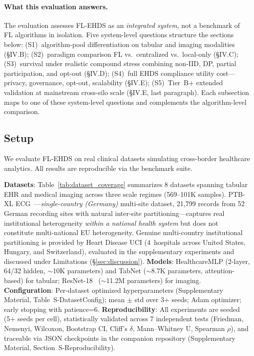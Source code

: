 \documentclass[conference]{IEEEtran}
\begin{document}
\paragraph{What this evaluation answers.} The evaluation assesses FL-EHDS as an \emph{integrated system}, not a benchmark of FL algorithms in isolation. Five system-level questions structure the sections below: (S1)~algorithm-pool differentiation on tabular and imaging modalities (\S IV.B); (S2)~paradigm comparison FL vs.\ centralized vs.\ local-only (\S IV.C); (S3)~survival under realistic compound stress combining non-IID, DP, partial participation, and opt-out (\S IV.D); (S4)~full EHDS compliance utility cost---privacy, governance, opt-out, scalability (\S IV.E); (S5)~Tier~B+ extended validation at mainstream cross-silo scale (\S IV.E, last paragraph). Each subsection maps to one of these system-level questions and complements the algorithm-level comparison.

\subsection{Setup}

We evaluate FL-EHDS on real clinical datasets simulating cross-border healthcare analytics. All results are reproducible via the benchmark suite.

\textbf{Datasets}: Table~\ref{tab:dataset_coverage} summarizes 8 datasets spanning tabular EHR and medical imaging across three scale regimes (569--101K samples). PTB-XL ECG~\cite{wagner2020ptbxl}---\emph{single-country (Germany)} multi-site dataset, 21,799 records from 52 German recording sites with natural inter-site partitioning---captures real institutional heterogeneity \emph{within a national health system} but does not constitute multi-national EU heterogeneity. Genuine multi-country institutional partitioning is provided by Heart Disease UCI (4~hospitals across United States, Hungary, and Switzerland), evaluated in the supplementary experiments and discussed under Limitations (\S\ref{sec:discussion}). \textbf{Models}: HealthcareMLP (2-layer, 64/32 hidden, $\sim$10K parameters) and TabNet ($\sim$8.7K parameters, attention-based) for tabular; ResNet-18~\cite{he2016deep} ($\sim$11.2M parameters) for imaging. \textbf{Configuration}: Per-dataset optimized hyperparameters (Supplementary Material, Table~S-DatasetConfig); mean $\pm$ std over 3+ seeds; Adam optimizer; early stopping with patience=6. \textbf{Reproducibility}: All experiments are seeded (5+ seeds per cell), statistically validated across 7 independent tests (Friedman, Nemenyi, Wilcoxon, Bootstrap CI, Cliff's $\delta$, Mann--Whitney U, Spearman $\rho$), and traceable via JSON checkpoints in the companion repository (Supplementary Material, Section~S-Reproducibility).
\end{document}
